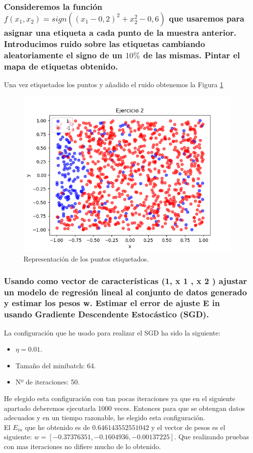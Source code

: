 \documentclass[12pt,a4paper]{article}
\begin{document}
\subsubsection{Consideremos la función $f(x_1,x_2) = sign((x_1-0,2)^2 + x^{2}_2 - 0,6)$ que usaremos para asignar una etiqueta a cada punto de la muestra anterior. Introducimos 	ruido sobre las etiquetas cambiando aleatoriamente el signo de un $10\%$ de las mismas. Pintar el mapa de etiquetas obtenido.}
Una vez etiquetados los puntos y añadido el ruido obtenemos la Figura \ref{pic:ruido}
\begin{figure}[H]  %
	
	\centering
	\includegraphics[width=0.7\textheight]{images/puntosConRuido.png}  %
	\caption{Representación de los puntos etiquetados.}
	\label{pic:ruido}
\end{figure}
\subsubsection{Usando como vector de características (1, x 1 , x 2 ) ajustar un modelo de regresión 	lineal al conjunto de datos generado y estimar los pesos w. Estimar el error de 	ajuste E in usando Gradiente Descendente Estocástico (SGD).}
La configuración que he usado para realizar el SGD ha sido la siguiente:
\begin{itemize}
	\item $\eta=0.01$.
	\item Tamaño del minibatch: 64.
	\item Nº de iteraciones: 50. 
\end{itemize}
He elegido esta configuración con tan pocas iteraciones ya que en el siguiente apartado deberemos ejecutarla 1000 veces. Entonces para que se obtengan datos adecuados y en un tiempo razonable, he elegido esta configuración.\\
El $E_{in}$ que he obtenido es de $0.646143552551042$ y el vector de pesos es el siguiente: $w = [-0.37376351, -0.1604936, -0.00137225]$. Que realizando pruebas con mas iteraciones no difiere mucho de lo obtenido.
\end{document}
